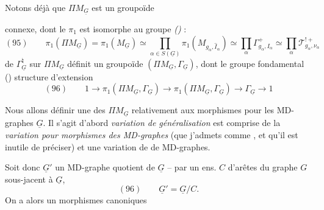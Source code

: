 \documentclass[11pt,a4paper]{article}
\begin{document}
Notons déjà que $\Pi M_{\underline{G}}$ est un groupoïde

connexe, dont le $\pi_1$ est isomorphe au groupe \emph{()} :
\[
(95)\qquad \pi_1(\Pi M_{\underline{G}}) = \pi_1(M_{\underline{G}}) \simeq \prod_{\alpha \in S(\underline{G})} \pi_1(M_{g_\alpha, \hat{I}_\alpha}) \simeq \prod_\alpha \Gamma^{+}_{g_\alpha, I_\alpha} \simeq \prod_\alpha \mathcal{T}^{!+}_{g_\alpha, \nu_\alpha}
\]
 de $\Gamma^{\natural}_{\underline{G}}$ sur $\Pi M_{\underline{G}}$ définit un groupoïde  $(\Pi M_{\underline{G}}, \Gamma_{\underline{G}})$, dont le groupe fondamental () \struck{\ill{}}  structure d'extension
\[
(96)\qquad 1 \to \pi_1(\Pi M_{\underline{G}}, \Gamma_{\underline{G}}) \to \pi_1(\Pi M_{\underline{G}}, \Gamma_{\underline{G}}) \longrightarrow \Gamma_{\underline{G}} \to 1
\]

Nous allons définir une   des $\Pi M_{\underline{G}}$ relativement aux \og morphismes\fg{} pour les MD-graphes $\underline{G}$. Il s'agit d'abord  \og \emph{variation de généralisation}\fg{}  est comprise de la \emph{variation pour morphismes des MD-graphes} (que j'admets comme \og {}\fg{}, et qu'il est inutile de préciser) et une \og variation de \struck{\ill{}}  de MD-graphes\fg{}.

Soit donc $\underline{G}'$ un MD-graphe quotient de $\underline{G}$ -- par un ens. $C$ d'arêtes du graphe $G$ sous-jacent à $\underline{G}$,
\[
(96)\qquad \underline{G}' = \underline{G} / C .
\]
On a alors un  morphismes canoniques

\end{document}

